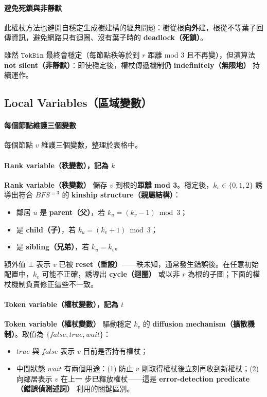 \documentclass[a4paper, 12pt]{article}
\newcommand{\rk}{k}
\begin{document}
\paragraph{避免死鎖與非靜默}
此權杖方法也避開自穩定生成樹建構的經典問題：樹從根\textbf{向外}建，根從不等葉子回傳資訊，避免網路只有迴圈、沒有葉子時的 \textbf{deadlock（死鎖）}。

雖然 \(\mathtt{TokBin}\) 最終會穩定（每節點秩等於到 \(r\) 距離 mod 3 且不再變），但演算法 \textbf{not silent（非靜默）}：即使穩定後，權杖傳遞機制仍 \textbf{indefinitely（無限地）} 持續運作。

\subsection{Local Variables（區域變數）}
\label{subsec:local-variables}

\paragraph{每個節點維護三個變數}
每個節點 \(v\) 維護三個變數，整理於表格中。

\paragraph{Rank variable（秩變數），記為 \(\rk\)}
\textbf{Rank variable（秩變數）} 儲存 \(v\) 到根的\textbf{距離 mod 3}。穩定後，\(\rk_v\in\{0,1,2\}\) 誘導出符合 \(BFS^{\equiv 3}\) 的 \textbf{kinship structure（親屬結構）}：
\begin{itemize}
    \item 鄰居 \(u\) 是 \textbf{parent（父）}，若 \(\rk_u=(\rk_v-1)\bmod 3\)；
    \item 是 \textbf{child（子）}，若 \(\rk_u=(\rk_v+1)\bmod 3\)；
    \item 是 \textbf{sibling（兄弟）}，若 \(\rk_u=\rk_v\)。
\end{itemize}

額外值 \(\bot\) 表示 \(v\) 已被 \textbf{reset（重設）}——秩未知，通常發生錯誤後。在任意初始配置中，\(\rk_v\) 可能不正確，誘導出 \textbf{cycle（迴圈）} 或以非 \(r\) 為根的子圖；下面的權杖機制負責修正這些不一致。

\paragraph{Token variable（權杖變數），記為 \(t\)}
\textbf{Token variable（權杖變數）} 驅動穩定 \(\rk_v\) 的 \textbf{diffusion mechanism（擴散機制）}。取值為 \(\{\mathit{false},\mathit{true},\mathit{wait}\}\)：
\begin{itemize}
    \item \(\mathit{true}\) 與 \(\mathit{false}\) 表示 \(v\) 目前是否持有權杖；
    \item 中間狀態 \(\mathit{wait}\) 有兩個用途：(1) 防止 \(v\) 剛取得權杖後立刻再收到新權杖；(2) 向鄰居表示 \(v\) 在上一 步已釋放權杖——這是 \textbf{error-detection predicate（錯誤偵測述詞）} 利用的關鍵區別。
\end{itemize}
\end{document}
